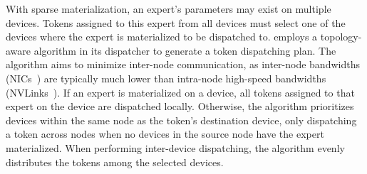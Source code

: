 With sparse materialization, an expert's parameters may exist on multiple devices. Tokens assigned to this expert from all devices must select one of the devices where the expert is materialized to be dispatched to. \xxx employs a topology-aware algorithm in its dispatcher to generate a token dispatching plan.
The algorithm aims to minimize inter-node communication, as inter-node bandwidths (\eg NICs~\cite{nvbandwidth2023}) are typically much lower than intra-node high-speed bandwidths (\eg NVLinks~\cite{nvlink2022docs}). 
If an expert is materialized on a device, all tokens assigned to that expert on the device are dispatched locally. Otherwise, the algorithm prioritizes devices within the same node as the token's destination device, only dispatching a token across nodes when no devices in the source node have the expert materialized. When performing inter-device dispatching, the algorithm evenly distributes the tokens among the selected devices.








